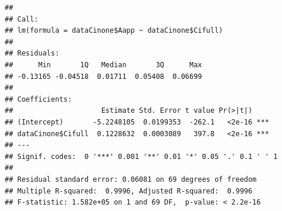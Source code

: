 \documentclass[
]{krantz}
\makeatletter
\newenvironment{Shaded}{\begin{snugshade}}{\end{snugshade}}
\newcommand{\CommentTok}[1]{\textcolor[rgb]{0.56,0.35,0.01}{\textit{#1}}}
\newcommand{\DecValTok}[1]{\textcolor[rgb]{0.00,0.00,0.81}{#1}}
\newcommand{\FunctionTok}[1]{\textcolor[rgb]{0.00,0.00,0.00}{#1}}
\newcommand{\NormalTok}[1]{#1}
\newcommand{\OtherTok}[1]{\textcolor[rgb]{0.56,0.35,0.01}{#1}}
\newcommand{\SpecialCharTok}[1]{\textcolor[rgb]{0.00,0.00,0.00}{#1}}
\newcommand{\StringTok}[1]{\textcolor[rgb]{0.31,0.60,0.02}{#1}}
\newenvironment{kframe}{%
\medskip{}
\setlength{\fboxsep}{.8em}
 \def\at@end@of@kframe{}%
 \ifinner\ifhmode%
  \def\at@end@of@kframe{\end{minipage}}%
  \begin{minipage}{\columnwidth}%
 \fi\fi%
 \def\FrameCommand##1{\hskip\@totalleftmargin \hskip-\fboxsep
 \colorbox{shadecolor}{##1}\hskip-\fboxsep
     \hskip-\linewidth \hskip-\@totalleftmargin \hskip\columnwidth}%
 \MakeFramed {\advance\hsize-\width
   \@totalleftmargin\z@ \linewidth\hsize
   \@setminipage}}%
 {\par\unskip\endMakeFramed%
 \at@end@of@kframe}
\renewenvironment{Shaded}{\begin{kframe}}{\end{kframe}}
\makeatother
\begin{document}
\begin{Shaded}
\end{Shaded}

\begin{verbatim}
## 
## Call:
## lm(formula = dataCinone$Aapp ~ dataCinone$Cifull)
## 
## Residuals:
##      Min       1Q   Median       3Q      Max 
## -0.13165 -0.04518  0.01711  0.05408  0.06699 
## 
## Coefficients:
##                     Estimate Std. Error t value Pr(>|t|)    
## (Intercept)       -5.2248105  0.0199353  -262.1   <2e-16 ***
## dataCinone$Cifull  0.1228632  0.0003089   397.8   <2e-16 ***
## ---
## Signif. codes:  0 '***' 0.001 '**' 0.01 '*' 0.05 '.' 0.1 ' ' 1
## 
## Residual standard error: 0.06081 on 69 degrees of freedom
## Multiple R-squared:  0.9996, Adjusted R-squared:  0.9996 
## F-statistic: 1.582e+05 on 1 and 69 DF,  p-value: < 2.2e-16
\end{verbatim}
\end{document}
